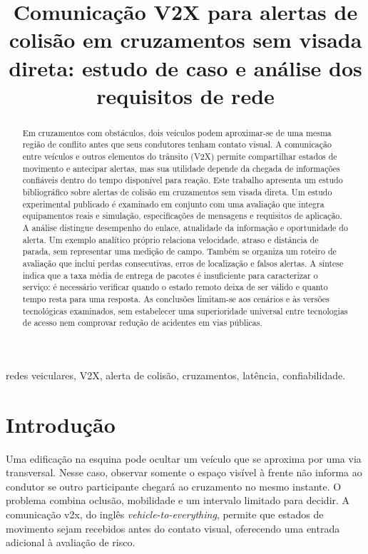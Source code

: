 \documentclass[conference,a4paper]{IEEEtran}
\title{Comunicação V2X para alertas de colisão em cruzamentos sem visada direta: estudo de caso e análise dos requisitos de rede}
\author{\IEEEauthorblockN{Álvaro Lucio Almeida Ribeiro e Matheus Henrique Fonseca Afonso}
\IEEEauthorblockA{Curso de Mestrado, Instituto Nacional de Telecomunicações -- Inatel\\
Santa Rita do Sapucaí, MG, Brasil\\
TP546 -- Internet das Coisas e Redes Veiculares\\
Professor: Samuel Baraldi Mafra}}
\begin{document}
\pagestyle{plain}
\maketitle
\thispagestyle{plain}

\begin{abstract}
Em cruzamentos com obstáculos, dois veículos podem aproximar-se de uma mesma região de conflito antes que seus condutores tenham contato visual. A comunicação entre veículos e outros elementos do trânsito (V2X) permite compartilhar estados de movimento e antecipar alertas, mas sua utilidade depende da chegada de informações confiáveis dentro do tempo disponível para reação. Este trabalho apresenta um estudo bibliográfico sobre alertas de colisão em cruzamentos sem visada direta. Um estudo experimental publicado é examinado em conjunto com uma avaliação que integra equipamentos reais e simulação, especificações de mensagens e requisitos de aplicação. A análise distingue desempenho do enlace, atualidade da informação e oportunidade do alerta. Um exemplo analítico próprio relaciona velocidade, atraso e distância de parada, sem representar uma medição de campo. Também se organiza um roteiro de avaliação que inclui perdas consecutivas, erros de localização e falsos alertas. A síntese indica que a taxa média de entrega de pacotes é insuficiente para caracterizar o serviço: é necessário verificar quando o estado remoto deixa de ser válido e quanto tempo resta para uma resposta. As conclusões limitam-se aos cenários e às versões tecnológicas examinados, sem estabelecer uma superioridade universal entre tecnologias de acesso nem comprovar redução de acidentes em vias públicas.
\end{abstract}

\begin{IEEEkeywords}
redes veiculares, V2X, alerta de colisão, cruzamentos, latência, confiabilidade.
\end{IEEEkeywords}

\section{Introdução}
Uma edificação na esquina pode ocultar um veículo que se aproxima por uma via transversal. Nesse caso, observar somente o espaço visível à frente não informa ao condutor se outro participante chegará ao cruzamento no mesmo instante. O problema combina oclusão, mobilidade e um intervalo limitado para decidir. A comunicação \ac{v2x}, do inglês \textit{vehicle-to-everything}, permite que estados de movimento sejam recebidos antes do contato visual, oferecendo uma entrada adicional à avaliação de risco.
\end{document}
